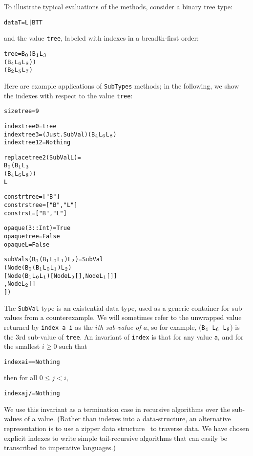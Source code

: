 \documentclass{sigplanconf}
\newenvironment{code}{\begin{alltt}\footnotesize}{\end{alltt}}
\newcommand{\ttp}[1]{\texttt{#1}}
\newcommand{\sub}[1]{\(\sb{#1}\)}
\begin{document}
\noindent
To illustrate typical evaluations of the methods, consider a binary tree type:
%
\begin{code}
data T = L | B T T
\end{code}
%
\noindent
and the value \ttp{tree}, labeled with indexes in a breadth-first order:
%
\begin{code}
tree = B\sub{0} (B\sub{1} L\sub{3}
             (B\sub{4} L\sub{6} L\sub{8}))
          (B\sub{2} L\sub{5} L\sub{7})
\end{code}
%
\noindent
Here are example applications of \ttp{SubTypes} methods; in the following, we
show the indexes with respect to the value \ttp{tree}:
%
\begin{code}
size tree = 9

index tree 0  = tree
index tree 3  = (Just . SubVal) (B\sub{4} L\sub{6} L\sub{8})
index tree 12 = Nothing

replace tree 2 (SubVal L) =
  B\sub{0} (B\sub{1} L\sub{3}
        (B\sub{4} L\sub{6} L\sub{8}))
     L

constr  tree = ["B"]
constrs tree = ["B", "L"]
constrs L    = ["B", "L"]

opaque (3 :: Int) = True
opaque tree       = False
opaque L          = False

subVals (B\sub{0} (B\sub{1} L\sub{0} L\sub{1}) L\sub{2}) = SubVal
  (Node (B\sub{0} (B\sub{1} L\sub{0} L\sub{1}) L\sub{2})
        [ Node (B\sub{1} L\sub{0} L\sub{1}) [Node L\sub{0} [], Node L\sub{1} []]
        , Node L\sub{2} []
        ])
\end{code}
%
\noindent
The \ttp{SubVal} type is an existential data type, used as a generic container
for sub-values from a counterexample.  We will sometimes refer to the unwrapped
value returned by \ttp{index a i} as the \emph{$i$th sub-value of $a$}, so for
example, (\ttp{B\sub{4} L\sub{6} L\sub{8}}) is the 3rd sub-value of \ttp{tree}.
An invariant of \ttp{index} is that for any value \ttp{a}, and for the smallest
$i \geq 0$ such that
%
\begin{code}
index a i == Nothing
\end{code}
%
\noindent
then for all $0 \leq j < i$,
%
\begin{code}
index a j /= Nothing
\end{code}
\noindent
We use this invariant as a termination case in recursive algorithms over the
sub-values of a value.  (Rather than indexes into a data-structure, an
alternative representation is to use a zipper data structure~\cite{zipper} to
traverse data.  We have chosen explicit indexes to write simple tail-recursive
algorithms that can easily be transcribed to imperative languages.)
\end{document}
